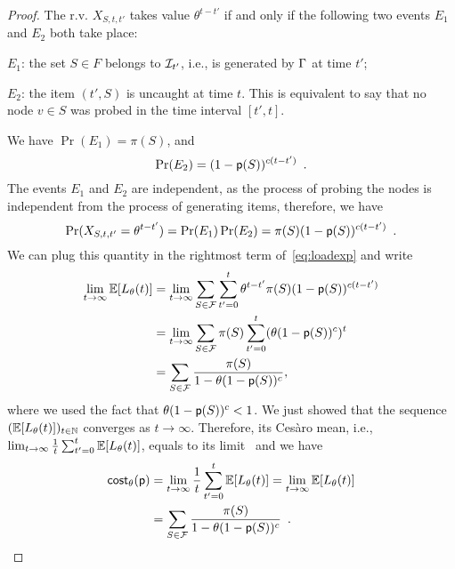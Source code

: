 \begin{proof}
	The r.v. $X_{S,t,t'}$ takes value $\theta^{t-t'}$ if and only if the
	following two events $E_1$ and $E_2$ both take place:
	\begin{itemize*}
		\item $E_1$: the set $S\in F$ belongs to $\mathcal{I}_{t'}$, i.e., is
			generated by $\Gamma$ at time $t'$;
		\item $E_2$: the item $(t',S)$ is uncaught at time $t$. This is
			equivalent to say that no node $v\in S$ was probed in the time
			interval $[t',t]$.
	\end{itemize*}
	We have $\Pr(E_1)=\pi(S)$, and
	\[
		\Pr(E_2)=(1-\mathsf{p}(S))^{c(t-t')}\enspace.
	\]
	The events $E_1$ and $E_2$ are independent, as the process of probing the
	nodes is independent from the process of generating items, therefore, we
	have
	\[
		\Pr(X_{S,t,t'}=\theta^{t-t'})=\Pr(E_1)\Pr(E_2)=\pi(S)(1-\mathsf{p}(S))^{c(t-t')}\enspace.
	\]
	We can plug this quantity in the rightmost term of~\eqref{eq:loadexp} and
	write
	\begin{align}
		\lim_{t\rightarrow\infty}\mathbb{E}[L_\theta(t)]
		&=\lim_{t\rightarrow\infty}\sum_{S\in\mathcal{F}}\sum_{t'=0}^t\theta^{t-t'}\pi(S)(1-\mathsf{p}(S))^{c(t-t')}\nonumber\\
		&=\lim_{t\rightarrow\infty}\sum_{S\in\mathcal{F}}\pi(S)\sum_{t'=0}^t(\theta(1-\mathsf{p}(S))^c)^{t}\nonumber\\
		&=\sum_{S\in\mathcal{F}}\frac{\pi(S)}{1-\theta(1-\mathsf{p}(S))^c},
	\end{align}
	where we used the fact that $\theta(1-\mathsf{p}(S))^c< 1$. We just showed that
	the sequence $(\mathbb{E}[L_\theta(t)])_{t\in\mathbb{N}}$ converges as $t\rightarrow \infty$. Therefore,
	its Ces\`aro mean, i.e.,
	$\lim_{t\rightarrow\infty}\frac{1}{t}\sum_{t'=0}^t\mathbb{E}[L_\theta(t)]$,
	equals to its limit~\citep[Sect.~5.4]{Hardy91} and we have
	\begin{align*}
		\mathsf{cost}_\theta(\mathsf{p})&=\lim_{t\rightarrow\infty}\frac{1}{t}\sum_{t'=0}^t\mathbb{E}[L_\theta(t)] =
		\lim_{t\rightarrow\infty} \mathbb{E}[L_\theta(t)]\\
		&=
		\sum_{S\in\mathcal{F}}\frac{\pi(S)}{1-\theta(1-\mathsf{p}(S))^c}\enspace.
	\end{align*}
\end{proof}

